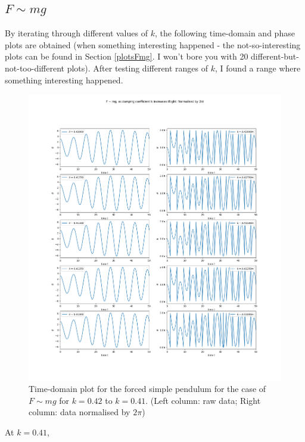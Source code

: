 \documentclass[10pt, twocolumn]{article}
\begin{document}
\subsection{$F \sim{mg}$}
By iterating through different values of $k$, the following time-domain and phase plots are obtained (when something interesting happened - the not-so-interesting plots can be found in Section \ref{plotsFmg}. I won't bore you with 20 different-but-not-too-different plots). After testing different ranges of $k$, I found a range where something interesting happened.
\onecolumn
\begin{figure}
    \centering
    \includegraphics[width= \columnwidth]{Projects/ForcedSimplePendulum/Plots/F~mg as damping coefficient k increases from 0.42 to 0.41.png}
    \caption{Time-domain plot for the forced simple pendulum for the case of $F \sim{mg}$ for $k = 0.42$ to $k = 0.41$. (Left column: raw data; Right column: data normalised by $2\pi$)}
    \label{k 5 to 1 short}
\end{figure}
\twocolumn
At $k = 0.41$,
\end{document}
